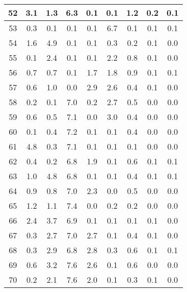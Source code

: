 \begin{table}[h!]
\begin{tabular}{|c|c|c|c|c|c|c|c|c|}
52           & 3.1 & 1.3 & 6.3 & 0.1  & 0.1  & 1.2  & 0.2   & 0.1   \\ \hline
53           & 0.3 & 0.1 & 0.1 & 0.1  & 6.7  & 0.1  & 0.1   & 0.1   \\ \hline
54           & 1.6 & 4.9 & 0.1 & 0.1  & 0.3  & 0.2  & 0.1   & 0.0   \\ \hline
55           & 0.1 & 2.4 & 0.1 & 0.1  & 2.2  & 0.8  & 0.1   & 0.0   \\ \hline
56           & 0.7 & 0.7 & 0.1 & 1.7  & 1.8  & 0.9  & 0.1   & 0.1   \\ \hline
57           & 0.6 & 1.0 & 0.0 & 2.9  & 2.6  & 0.4  & 0.1   & 0.0   \\ \hline
58           & 0.2 & 0.1 & 7.0 & 0.2  & 2.7  & 0.5  & 0.0   & 0.0   \\ \hline
59           & 0.6 & 0.5 & 7.1 & 0.0  & 3.0  & 0.4  & 0.0   & 0.0   \\ \hline
60           & 0.1 & 0.4 & 7.2 & 0.1  & 0.1  & 0.4  & 0.0   & 0.0   \\ \hline
61           & 4.8 & 0.3 & 7.1 & 0.1  & 0.1  & 0.1  & 0.0   & 0.0   \\ \hline
62           & 0.4 & 0.2 & 6.8 & 1.9  & 0.1  & 0.6  & 0.1   & 0.1   \\ \hline
63           & 1.0 & 4.8 & 6.8 & 0.1  & 0.1  & 0.4  & 0.1   & 0.1   \\ \hline
64           & 0.9 & 0.8 & 7.0 & 2.3  & 0.0  & 0.5  & 0.0   & 0.0   \\ \hline
65           & 1.2 & 1.1 & 7.4 & 0.0  & 0.2  & 0.2  & 0.0   & 0.0   \\ \hline
66           & 2.4 & 3.7 & 6.9 & 0.1  & 0.1  & 0.1  & 0.1   & 0.0   \\ \hline
67           & 0.3 & 2.7 & 7.0 & 2.7  & 0.1  & 0.4  & 0.1   & 0.0   \\ \hline
68           & 0.3 & 2.9 & 6.8 & 2.8  & 0.3  & 0.6  & 0.1   & 0.1   \\ \hline
69           & 0.6 & 3.2 & 7.6 & 2.6  & 0.1  & 0.6  & 0.0   & 0.0   \\ \hline
70           & 0.2 & 2.1 & 7.6 & 2.0  & 0.1  & 0.3  & 0.1   & 0.0   \\ \hline
\end{tabular}
\end{table}